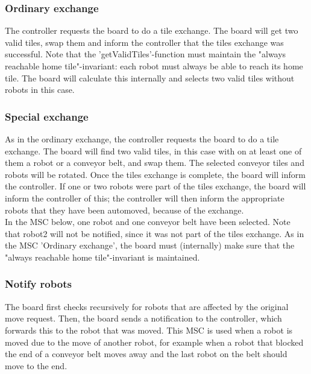 	\subsubsection{Ordinary exchange}
	\begin{minipage}{\linewidth}
		The controller requests the board to do a tile exchange. The board will get two valid tiles, swap them and inform the controller that the tiles exchange was successful. Note that the 'getValidTiles'-function must maintain the "always reachable home tile"-invariant: each robot must always be able to reach its home tile. The board will calculate this internally and selects two valid tiles without robots in this case.

		
	\end{minipage}

	\subsubsection{Special exchange}
	\begin{minipage}{\linewidth}
		As in the ordinary exchange, the controller requests the board to do a tile exchange. The board will find two valid tiles, in this case with on at least one of them a robot or a conveyor belt, and swap them. The selected conveyor tiles and robots will be rotated. Once the tiles exchange is complete, the board will inform the controller. If one or two robots were part of the tiles exchange, the board will inform the controller of this; the controller will then inform the appropriate robots that they have been automoved, because of the exchange. \\
In the MSC below, one robot and one conveyor belt have been selected. Note that robot2 will not be notified, since it was not part of the tiles exchange. As in the MSC 'Ordinary exchange', the board must (internally) make sure that the "always reachable home tile"-invariant is maintained.

		
	\end{minipage}	

	\subsubsection{Notify robots}
	\begin{minipage}{\linewidth}
		The board first checks recursively for robots that are affected by the original move request. Then, the board sends a notification to the controller, which forwards this to the robot that was moved. This MSC is used when a robot is moved due to the move of another robot, for example when a robot that blocked the end of a conveyor belt moves away and the last robot on the belt should move to the end.

		
	\end{minipage}


